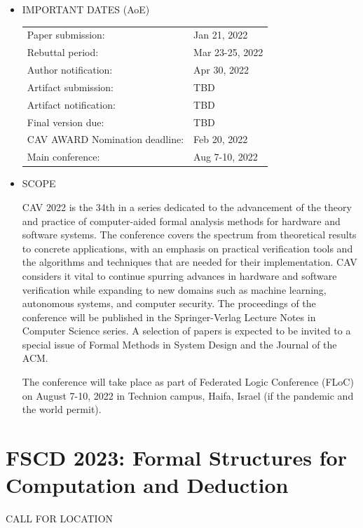 \documentclass[prodmode,acmtecs]{acmsmall} %
\begin{document}
\begin{itemize}\item  IMPORTANT DATES (AoE) 
 
\begin{tabulary}{\linewidth}{LL}Paper submission:  & Jan 21, 2022 \\
Rebuttal period:  & Mar 23-25, 2022 \\
Author notification:  & Apr 30, 2022 \\
Artifact submission:  & TBD \\
Artifact notification:  & TBD \\
Final version due:  & TBD \\
CAV AWARD Nomination deadline:  & Feb 20, 2022 \\
Main conference:  & Aug 7-10, 2022 \\
\end{tabulary}
 
\item  SCOPE  
 
  CAV 2022 is the 34th in a series dedicated to the advancement of the theory and practice of computer-aided formal analysis methods for hardware and software systems. The conference covers the spectrum from theoretical results to concrete applications, with an emphasis on practical verification tools and the algorithms and techniques that are needed for their implementation. CAV considers it vital to continue spurring advances in hardware and software verification while expanding to new domains such as machine learning, autonomous systems, and computer security. The proceedings of the conference will be published in the Springer-Verlag Lecture Notes in Computer Science series. A selection of papers is expected to be invited to a special issue of Formal Methods in System Design and the Journal of the ACM. 
 
  The conference will take place as part of Federated Logic Conference (FLoC) on August 7-10, 2022 in Technion campus, Haifa, Israel (if the pandemic and the world permit). 
 
\end{itemize}\section{FSCD 2023: Formal Structures for Computation and Deduction}\label{FSCD2023}CALL FOR LOCATION 
\end{document}
